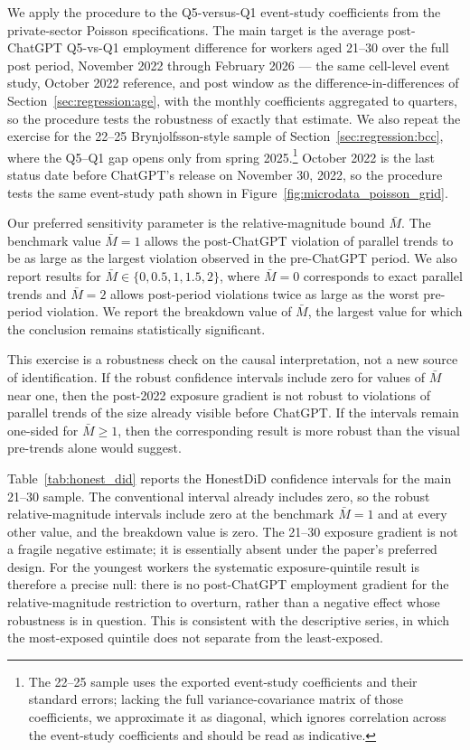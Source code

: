 \documentclass[12pt]{article}
\begin{document}
We apply the procedure to the Q5-versus-Q1 event-study coefficients from the private-sector Poisson specifications. The main target is the average post-ChatGPT Q5-vs-Q1 employment difference for workers aged 21--30 over the full post period, November 2022 through February 2026 --- the same cell-level event study, October 2022 reference, and post window as the difference-in-differences of Section~\ref{sec:regression:age}, with the monthly coefficients aggregated to quarters, so the procedure tests the robustness of exactly that estimate. We also repeat the exercise for the 22--25 Brynjolfsson-style sample of Section~\ref{sec:regression:bcc}, where the Q5--Q1 gap opens only from spring 2025.\footnote{The 22--25 sample uses the exported event-study coefficients and their standard errors; lacking the full variance-covariance matrix of those coefficients, we approximate it as diagonal, which ignores correlation across the event-study coefficients and should be read as indicative.} October 2022 is the last status date before ChatGPT's release on November 30, 2022, so the procedure tests the same event-study path shown in Figure~\ref{fig:microdata_poisson_grid}.

Our preferred sensitivity parameter is the relative-magnitude bound $\bar{M}$. The benchmark value $\bar{M}=1$ allows the post-ChatGPT violation of parallel trends to be as large as the largest violation observed in the pre-ChatGPT period. We also report results for $\bar{M}\in\{0,0.5,1,1.5,2\}$, where $\bar{M}=0$ corresponds to exact parallel trends and $\bar{M}=2$ allows post-period violations twice as large as the worst pre-period violation. We report the breakdown value of $\bar{M}$, the largest value for which the conclusion remains statistically significant.

This exercise is a robustness check on the causal interpretation, not a new source of identification. If the robust confidence intervals include zero for values of $\bar{M}$ near one, then the post-2022 exposure gradient is not robust to violations of parallel trends of the size already visible before ChatGPT. If the intervals remain one-sided for $\bar{M}\geq 1$, then the corresponding result is more robust than the visual pre-trends alone would suggest.

Table~\ref{tab:honest_did} reports the HonestDiD confidence intervals for the main 21--30 sample. The conventional interval already includes zero, so the robust relative-magnitude intervals include zero at the benchmark $\bar{M}=1$ and at every other value, and the breakdown value is zero. The 21--30 exposure gradient is not a fragile negative estimate; it is essentially absent under the paper's preferred design. For the youngest workers the systematic exposure-quintile result is therefore a precise null: there is no post-ChatGPT employment gradient for the relative-magnitude restriction to overturn, rather than a negative effect whose robustness is in question. This is consistent with the descriptive series, in which the most-exposed quintile does not separate from the least-exposed.
\end{document}
